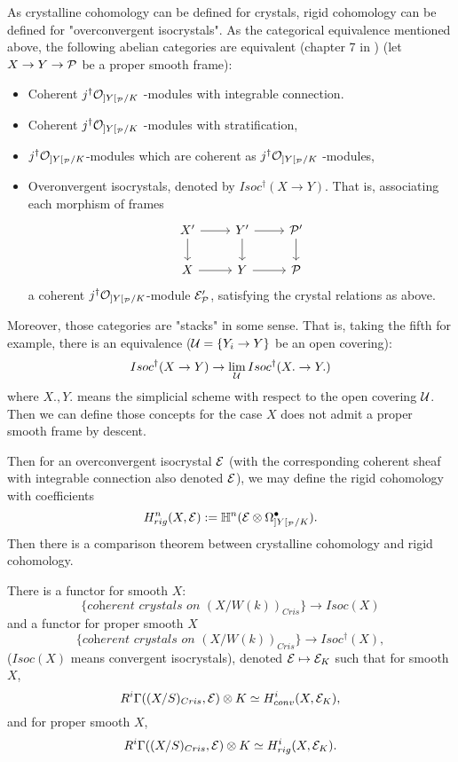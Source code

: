 As crystalline cohomology can be defined for crystals, 
rigid cohomology can be defined for "overconvergent isocrystals". 
As the categorical equivalence mentioned above, 
the following abelian categories are equivalent 
(chapter 7 in \cite{St}) (let $X \to Y \to {\mathcal {P}}$ be a proper smooth frame):
\begin{itemize}
    \item 
        Coherent $j^\dagger {\mathcal {O}}_{]Y[_{\mathcal {P}}/K}$ -modules with integrable connection.
    \item 
        Coherent $j^\dagger {\mathcal {O}}_{]Y[_{\mathcal {P}}/K}$ -modules with stratification,
    \item 
        $j^\dagger {\mathcal {O}}_{]Y[_{\mathcal {P}}/K}$-modules 
        which are coherent as $j^\dagger {\mathcal {O}}_{]Y[_{\mathcal {P}}/K}$ -modules,
    \item 
        Overonvergent isocrystals, denoted by $Isoc^\dagger(X \to Y)$. 
        That is, associating each morphism of frames
        \[
            \begin{tikzcd}
                X' \ar[r] \ar[d] & Y' \ar[r] \ar[d] & \CP' \ar[d] \\
                X \ar[r] & Y \ar[r]& \CP
            \end{tikzcd}
        \]
    a coherent $j^\dagger {\mathcal {O}}_{]Y[_{\mathcal {P}}/K}$-module ${\mathcal {E}}_{\mathcal {P}}'$, 
    satisfying the crystal relations as above.
\end{itemize}

Moreover, those categories are "stacks" in some sense. 
That is, taking the fifth for example, 
there is an equivalence (${\mathcal {U}} = \{Y_i \to Y\}$ be an open covering):
\[
    Isoc^\dagger (X \to Y) \to \lim_{{\mathcal {U}}} Isoc^\dagger (X. \to Y.)
\]
where $X.,Y.$ means the simplicial scheme with respect to the open covering ${\mathcal {U}}$. 
Then we can define those concepts for the case $X$ 
does not admit a proper smooth frame by descent.

Then for an overconvergent isocrystal ${\mathcal {E}}$ 
(with the corresponding coherent sheaf with integrable connection also denoted ${\mathcal {E}}$), 
we may define the rigid cohomology with coefficients
\[
    H^n_{rig}(X,{\mathcal {E}}) := {\mathbb {H}}^n({\mathcal {E}} \otimes \Omega_{]Y[_{\mathcal {P}}/K}^\bullet).
\]
Then there is a comparison theorem between crystalline cohomology and rigid cohomology.
\begin{theorem}
    There is a functor for smooth $X$:
    \[
        \{\textit{coherent crystals on } (X/W(k))_{Cris}\} \to Isoc(X)
    \]
    and a functor for proper smooth $X$
    \[
        \{\textit{coherent crystals on }(X/W(k))_{Cris}\} \to Isoc^\dagger(X),
    \]
    ($Isoc(X)$ means convergent isocrystals), 
    denoted ${\mathcal {E}} \mapsto {\mathcal {E}}_K$ such that for smooth $X$,
    \[
        R^i\Gamma((X/S)_{Cris}, {\mathcal {E}}) \otimes K \simeq H^i_{conv}(X, {\mathcal {E}}_K),
    \]
    and for proper smooth $X$,
    \[
        R^i\Gamma((X/S)_{Cris}, {\mathcal {E}}) \otimes K \simeq H^i_{rig}(X, {\mathcal {E}}_K).
    \]
\end{theorem}

